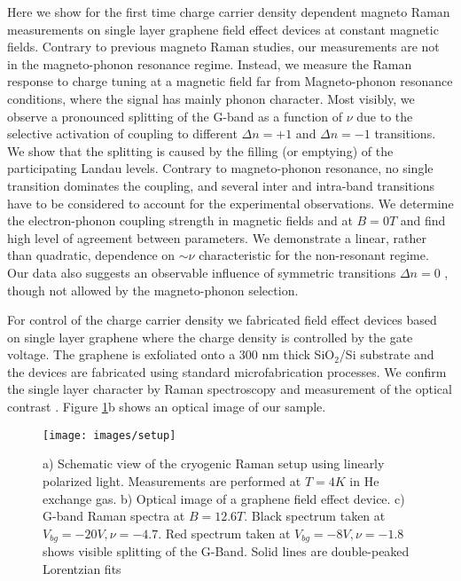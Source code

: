 \documentclass[prl,aps,superscriptaddress,showpacs,reprint]{revtex4-1}
\begin{document}
Here we show for the first time charge carrier density dependent magneto Raman measurements on single layer graphene field effect devices at constant magnetic fields. Contrary to previous magneto Raman studies, our measurements are not in the magneto-phonon resonance regime. Instead, we measure the Raman response to charge tuning at a magnetic field far from Magneto-phonon resonance conditions, where the signal has mainly phonon character. Most visibly, we observe a pronounced splitting of the G-band as a function of $\nu$ due to the selective activation of coupling to different $\Delta n=+1$ and $\Delta n=-1$ transitions. We show that the splitting is caused by the filling (or emptying) of the participating Landau levels. Contrary to magneto-phonon resonance, no single transition dominates the coupling, and several inter and intra-band transitions have to be considered to account for the experimental observations. We determine the electron-phonon coupling strength in magnetic fields and at $B=0T$ and find high level of agreement between parameters. We demonstrate a linear, rather than quadratic, dependence on  $\sim \nu$ characteristic for the non-resonant regime.  Our data also suggests an observable influence of symmetric transitions $\Delta n=0$ \cite{kuhne2012polarization}, though not allowed by the magneto-phonon selection.

For control of the charge carrier density we fabricated field effect devices based on single layer graphene  where the charge density is controlled by the gate voltage. The graphene is exfoliated onto a 300 nm thick SiO$_2$/Si substrate and the devices are fabricated using standard microfabrication processes.  We confirm the single layer character by Raman spectroscopy and measurement of the optical contrast \cite{ferrari2006raman,casiraghi2007rayleigh,ni2007graphene,blake2007making}. Figure \ref{setup}b shows an optical image of our sample.

\begin{figure}
   \texttt{[image: images/setup]}
   \caption{\label{setup}a) Schematic view of the cryogenic Raman setup using linearly polarized light. Measurements are performed at $T=4K$ in He exchange gas. b) Optical image of a graphene field effect device. c) G-band Raman spectra at $B=12.6T$. Black spectrum taken at $V_{bg}=-20V, \nu=-4.7$. Red spectrum taken at $V_{bg}=-8V,\nu=-1.8$ shows visible splitting of the G-Band. Solid lines are double-peaked Lorentzian fits}
\end{figure}
\end{document}

